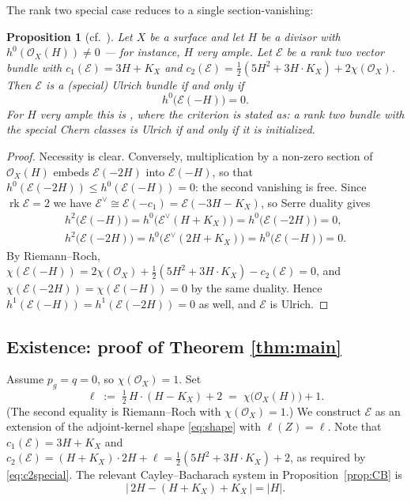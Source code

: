 \documentclass[10pt,a4paper]{amsart}
\newtheorem{proposition}[theorem]{Proposition}
\newcommand{\OO}{\mathcal{O}}
\newcommand{\EE}{\mathcal{E}}
\newcommand{\rk}{\operatorname{rk}}
\newcommand{\len}{\ell}
\begin{document}
The rank two special case reduces to a single section-vanishing:

\begin{proposition}[cf.\ {\cite[Prop.~2.1(4) and Cor.~2.4]{Cas17}}]\label{prop:reduction}
Let $X$ be a surface and let $H$ be a divisor with $h^0(\OO_X(H))\neq0$ --- for instance, $H$ very ample. Let $\EE$ be a rank two vector bundle with $c_1(\EE)=3H+K_X$ and $c_2(\EE)=\tfrac12(5H^2+3H\cdot K_X)+2\chi(\OO_X)$. Then $\EE$ is a (special) Ulrich bundle if and only if
\[
h^0\bigl(\EE(-H)\bigr)=0 .
\]
For $H$ very ample this is \cite[Cor.~2.4]{Cas17}, where the criterion is stated as: a rank two bundle with the special Chern classes is Ulrich if and only if it is initialized.
\end{proposition}

\begin{proof}
Necessity is clear. Conversely, multiplication by a non-zero section of $\OO_X(H)$ embeds $\EE(-2H)$ into $\EE(-H)$, so that $h^0(\EE(-2H))\le h^0(\EE(-H))=0$: the second vanishing is free. Since $\rk\EE=2$ we have $\EE^\vee\cong\EE(-c_1)=\EE(-3H-K_X)$, so Serre duality gives
\begin{gather*}
h^2\bigl(\EE(-H)\bigr)=h^0\bigl(\EE^\vee(H+K_X)\bigr)=h^0\bigl(\EE(-2H)\bigr)=0,\\
h^2\bigl(\EE(-2H)\bigr)=h^0\bigl(\EE^\vee(2H+K_X)\bigr)=h^0\bigl(\EE(-H)\bigr)=0 .
\end{gather*}
By Riemann--Roch, $\chi(\EE(-H))=2\chi(\OO_X)+\tfrac12(5H^2+3H\cdot K_X)-c_2(\EE)=0$, and $\chi(\EE(-2H))=\chi(\EE(-H))=0$ by the same duality. Hence $h^1(\EE(-H))=h^1(\EE(-2H))=0$ as well, and $\EE$ is Ulrich.
\end{proof}

\subsection{Existence: proof of Theorem \ref{thm:main}}\label{subsec:existence}
Assume $p_g=q=0$, so $\chi(\OO_X)=1$. Set
\[
\len\;:=\;\tfrac12\,H\cdot(H-K_X)+2\;=\;\chi\bigl(\OO_X(H)\bigr)+1 .
\]
(The second equality is Riemann--Roch with $\chi(\OO_X)=1$.) We construct $\EE$ as an extension of the adjoint-kernel shape \eqref{eq:shape} with $\len(Z)=\len$. Note that $c_1(\EE)=3H+K_X$ and
$c_2(\EE)=(H+K_X)\cdot 2H+\len=\tfrac12(5H^2+3H\cdot K_X)+2$,
as required by \eqref{eq:c2special}. The relevant Cayley--Bacharach system in Proposition~\ref{prop:CB} is
\[
\bigl|\,2H-(H+K_X)+K_X\,\bigr|=|H| .
\]
\end{document}
